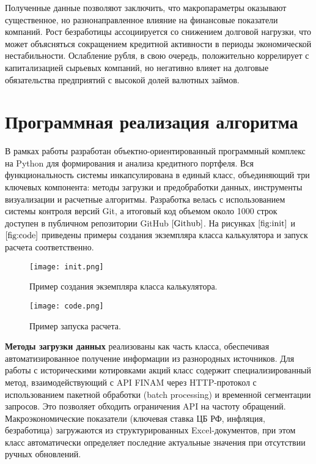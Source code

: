 \documentclass[]{article}
\begin{document}
	Полученные данные позволяют заключить, что макропараметры оказывают существенное, но разнонаправленное влияние на финансовые показатели компаний. Рост безработицы ассоциируется со снижением долговой нагрузки, что может объясняться сокращением кредитной активности в периоды экономической нестабильности. Ослабление рубля, в свою очередь, положительно коррелирует с капитализацией сырьевых компаний, но негативно влияет на долговые обязательства предприятий с высокой долей валютных займов.
	
	\section{Программная реализация алгоритма}
	
	В рамках работы разработан объектно-ориентированный программный комплекс на Python для формирования и анализа кредитного портфеля. Вся функциональность системы инкапсулирована в единый класс, объединяющий три ключевых компонента: методы загрузки и предобработки данных, инструменты визуализации и расчетные алгоритмы. Разработка велась с использованием системы контроля версий Git, а итоговый код объемом около 1000 строк доступен в публичном репозитории GitHub $\cite{Github}$.
	На рисунках $\ref{fig:init}$ и $\ref{fig:code}$ приведены примеры создания экземпляра класса калькулятора и запуск расчета соответственно.
	
	\begin{figure}[ht] %
		\centering %
		\texttt{[image: init.png]} %
		\caption{Пример создания экземпляра класса калькулятора.} %
		\label{fig:init} %
	\end{figure}
	
	\begin{figure}[ht] %
		\centering %
		\texttt{[image: code.png]} %
		\caption{Пример запуска расчета.} %
		\label{fig:code} %
	\end{figure}
	
	
	\textbf{Методы загрузки данных} реализованы как часть класса, обеспечивая автоматизированное получение информации из разнородных источников. Для работы с историческими котировками акций класс содержит специализированный метод, взаимодействующий с API FINAM через HTTP-протокол с использованием пакетной обработки (batch processing) и временной сегментации запросов. Это позволяет обходить ограничения API на частоту обращений. Макроэкономические показатели (ключевая ставка ЦБ РФ, инфляция, безработица) загружаются из структурированных Excel-документов, при этом класс автоматически определяет последние актуальные значения при отсутствии ручных обновлений.
	
\end{document}
